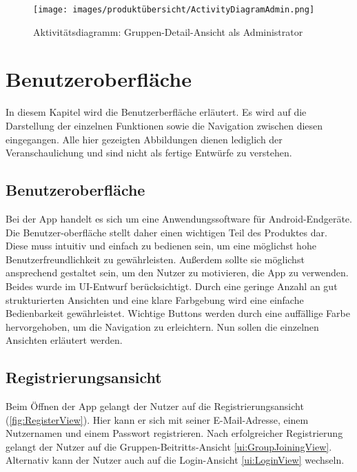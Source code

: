 \documentclass[parskip=full]{scrartcl}
\newcommand{\changelocaltocdepth}[1]{%
  \addtocontents{toc}{\protect\setcounter{tocdepth}{#1}}%
  \setcounter{tocdepth}{#1}%
}
\newcommand{\enablesubsectionnumbering}[1]{
    \renewcommand{\thesubsection}{$\langle$#1\arabic{subsection}0$\rangle$}
    \changelocaltocdepth{1} 
}
\begin{document}
\begin{figure}[!htp]
    \centering
    \begin{adjustbox}{right=150mm}
        \texttt{[image: images/produktübersicht/ActivityDiagramAdmin.png]}
    \end{adjustbox}

    \caption{Aktivitätsdiagramm: Gruppen-Detail-Ansicht als Administrator}
    \label{fig:ActivityDiagramAdmin}
\end{figure}
\newpage

\section{ Benutzeroberfläche }
\enablesubsectionnumbering{UI}
In diesem Kapitel wird die Benutzerberfläche erläutert. Es wird auf die Darstellung der einzelnen Funktionen sowie die Navigation zwischen diesen eingegangen. Alle hier gezeigten Abbildungen dienen lediglich der Veranschaulichung und sind nicht als fertige Entwürfe zu verstehen.

\subsection*{Benutzeroberfläche}
Bei der App handelt es sich um eine Anwendungssoftware für Android-Endgeräte. Die Benutzer-oberfläche stellt daher einen wichtigen Teil des Produktes dar. Diese muss intuitiv und einfach zu bedienen sein, um eine möglichst hohe Benutzerfreundlichkeit zu gewährleisten. Außerdem sollte sie möglichst ansprechend gestaltet sein, um den Nutzer zu motivieren, die App zu verwenden. Beides wurde im UI-Entwurf berücksichtigt. Durch eine geringe Anzahl an gut strukturierten Ansichten und eine klare Farbgebung wird eine einfache Bedienbarkeit gewährleistet. Wichtige Buttons werden durch eine auffällige Farbe hervorgehoben, um die Navigation zu erleichtern. Nun sollen die einzelnen Ansichten erläutert werden.

\subsection{Registrierungsansicht}
\label{ui:RegisterView}
Beim Öffnen der App gelangt der Nutzer auf die Registrierungsansicht (\autoref{fig:RegisterView}). Hier kann er sich mit seiner E-Mail-Adresse, einem Nutzernamen und einem Passwort registrieren. Nach erfolgreicher Registrierung gelangt der Nutzer auf die Gruppen-Beitritts-Ansicht \ref{ui:GroupJoiningView}. Alternativ kann der Nutzer auch auf die Login-Ansicht \ref{ui:LoginView} wechseln.
\end{document}
